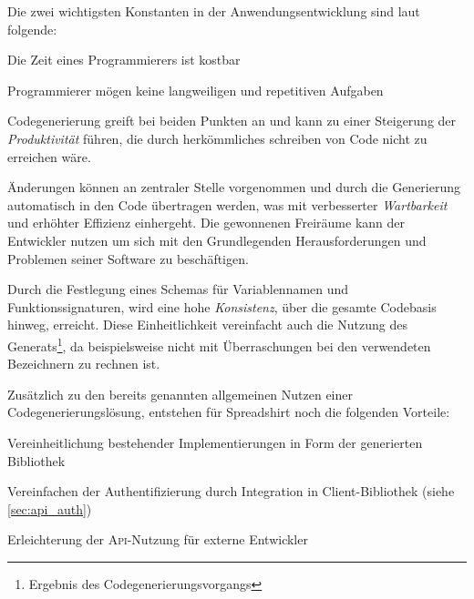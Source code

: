 
Die zwei wichtigsten Konstanten in der Anwendungsentwicklung sind laut \parencite{herrington2003code} folgende:
\begin{compactitem}
    \item Die Zeit eines Programmierers ist kostbar
    \item Programmierer mögen keine langweiligen und repetitiven Aufgaben
\end{compactitem}
Codegenerierung greift bei beiden Punkten an und kann zu einer Steigerung der \emph{Produktivität} führen, die durch herkömmliches schreiben von Code nicht zu erreichen wäre. 

Änderungen können an zentraler Stelle vorgenommen und durch die Generierung automatisch in den Code übertragen werden, was mit verbesserter \emph{Wartbarkeit} und erhöhter Effizienz einhergeht.
Die gewonnenen Freiräume kann der Entwickler nutzen um sich mit den Grundlegenden Herausforderungen und Problemen seiner Software zu beschäftigen.

Durch die Festlegung eines Schemas für Variablennamen und Funktionssignaturen, wird eine hohe \emph{Konsistenz}, über die gesamte Codebasis hinweg, erreicht.
Diese Einheitlichkeit vereinfacht auch die Nutzung des Generats\footnote{Ergebnis des Codegenerierungsvorgangs}, da beispielsweise nicht mit Überraschungen bei den verwendeten Bezeichnern zu rechnen ist.



Zusätzlich zu den bereits genannten allgemeinen Nutzen einer Codegenerierungslösung, entstehen für Spreadshirt noch die folgenden Vorteile:
\begin{compactitem}
    \item Vereinheitlichung bestehender Implementierungen in Form der generierten Bibliothek
    \item Vereinfachen der Authentifizierung durch Integration in Client-Bibliothek (siehe \cref{sec:api_auth})
    \item Erleichterung der \textsc{Api}-Nutzung für externe Entwickler
\end{compactitem}

